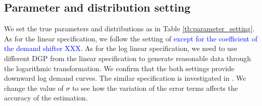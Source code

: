 \documentclass[11pt, a4paper]{article}
\begin{document}
\subsection{Parameter and distribution setting}

We set the true parameters and distributions as in Table \ref{tb:parameter_setting}. 
As for the linear specification, we follow the setting of \cite{perloff2012collinearity} \textcolor{blue}{except for the coefficient of the demand shifter XXX.}
As for the log linear specification, we need to use different DGP from the linear specification to generate reasonable data through the logarithmic transformation. 
We confirm that the both settings provide downward log demand curves.
The similar specification is investigated in \cite{hyde1995can}.
We change the value of $\sigma$ to see how the variation of the error terms affects the accuracy of the estimation.
\end{document}
